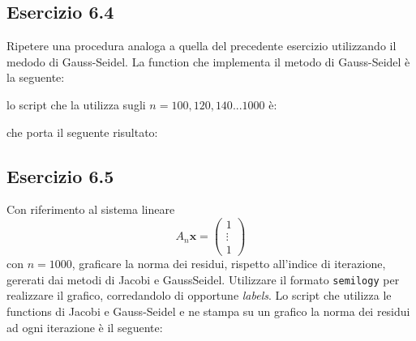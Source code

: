 	\subsection{Esercizio 6.4}
	
Ripetere una procedura analoga a quella del precedente esercizio utilizzando il medodo di Gauss-Seidel.
\PP
La function che implementa il metodo di Gauss-Seidel è la seguente:

lo script che la utilizza sugli $n = 100, 120, 140 ... 1000$ è:

che porta il seguente risultato:



	\subsection{Esercizio 6.5}
	
Con riferimento al sistema lineare
\begin{equation*}
	A_n \mathbf{x} = \begin{pmatrix} 1 \\ \vdots \\ 1 \end{pmatrix}
\end{equation*}
con $n = 1000$, graficare la norma dei residui, rispetto all’indice di iterazione, gererati dai metodi di Jacobi e GaussSeidel.
Utilizzare il formato \lstinline{semilogy} per realizzare il grafico, corredandolo di opportune \textit{labels}.
\PP
Lo script che utilizza le functions di Jacobi e Gauss-Seidel e ne stampa su un grafico la norma dei residui ad ogni iterazione è il seguente:
